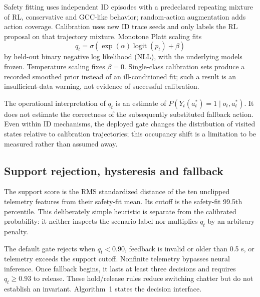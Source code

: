 \documentclass[10pt]{article}
\begin{document}
Safety fitting uses independent ID episodes with a predeclared repeating mixture of RL, conservative and GCC-like behavior; random-action augmentation adds action coverage. Calibration uses new ID trace seeds and only labels the RL proposal on that trajectory mixture. Monotone Platt scaling fits
\begin{equation}
q_t=\sigma\left(\exp(\alpha)\operatorname{logit}(p_t)+\beta\right)
\end{equation}
by held-out binary negative log likelihood (NLL), with the underlying models frozen. Temperature scaling fixes $\beta=0$. Single-class calibration sets produce a recorded smoothed prior instead of an ill-conditioned fit; such a result is an insufficient-data warning, not evidence of successful calibration.

The operational interpretation of $q_t$ is an estimate of $P(Y_t(a_t^*)=1\mid o_t,a_t^*)$. It does not estimate the correctness of the subsequently substituted fallback action. Even within ID mechanisms, the deployed gate changes the distribution of visited states relative to calibration trajectories; this occupancy shift is a limitation to be measured rather than assumed away.

\subsection{Support rejection, hysteresis and fallback}
The support score is the RMS standardized distance of the ten unclipped telemetry features from their safety-fit mean. Its cutoff is the safety-fit 99.5th percentile. This deliberately simple heuristic is separate from the calibrated probability: it neither inspects the scenario label nor multiplies $q_t$ by an arbitrary penalty.

The default gate rejects when $q_t<0.90$, feedback is invalid or older than 0.5 s, or telemetry exceeds the support cutoff. Nonfinite telemetry bypasses neural inference. Once fallback begins, it lasts at least three decisions and requires $q_t\geq0.93$ to release. These hold/release rules reduce switching chatter but do not establish an invariant. Algorithm~1 states the decision interface.
\end{document}
